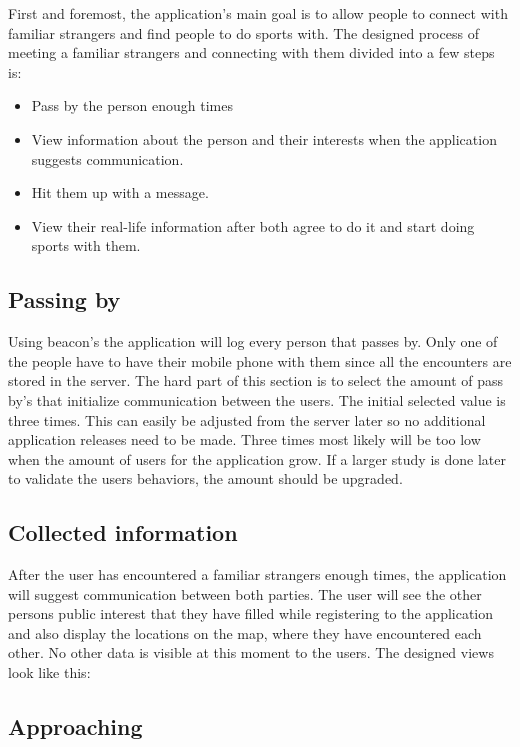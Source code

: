 First and foremost, the application's main goal is to allow people to connect with familiar strangers and find people to do sports with. The designed process of meeting a familiar strangers and connecting with them divided into a few steps is:

\begin{itemize}
	\item Pass by the person enough times
	\item View information about the person and their interests when the application suggests communication.
	\item Hit them up with a message.
	\item View their real-life information after both agree to do it and start doing sports with them.
\end{itemize}

\subsection{Passing by}

Using beacon's the application will log every person that passes by. Only one of the people have to have their mobile phone with them since all the encounters are stored in the server. The hard part of this section is to select the amount of pass by's that initialize communication between the users. The initial selected value is three times. This can easily be adjusted from the server later so no additional application releases need to be made. Three times most likely will be too low when the amount of users for the application grow. If a larger study is done later to validate the users behaviors, the amount should be upgraded.

\subsection{Collected information}

After the user has encountered a familiar strangers enough times, the application will suggest communication between both parties. The user will see the other persons public interest that they have filled while registering to the application and also display the locations on the map, where they have encountered each other. No other data is visible at this moment to the users. The designed views look like this:

\subsection{Approaching}

